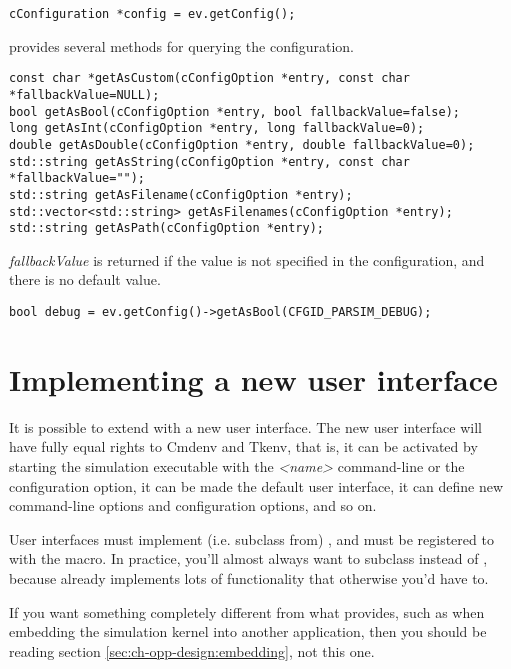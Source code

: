 \begin{verbatim}
cConfiguration *config = ev.getConfig();
\end{verbatim}

 provides several methods for querying the configuration.

\begin{verbatim}
const char *getAsCustom(cConfigOption *entry, const char *fallbackValue=NULL);
bool getAsBool(cConfigOption *entry, bool fallbackValue=false);
long getAsInt(cConfigOption *entry, long fallbackValue=0);
double getAsDouble(cConfigOption *entry, double fallbackValue=0);
std::string getAsString(cConfigOption *entry, const char *fallbackValue="");
std::string getAsFilename(cConfigOption *entry);
std::vector<std::string> getAsFilenames(cConfigOption *entry);
std::string getAsPath(cConfigOption *entry);
\end{verbatim}

\textit{fallbackValue} is returned if the value is not specified in the configuration,
and there is no default value.

\begin{verbatim}
bool debug = ev.getConfig()->getAsBool(CFGID_PARSIM_DEBUG);
\end{verbatim}


\section{Implementing a new user interface}
\label{sec:plugin-exts:userinterface}

It is possible to extend {\opp} with a new user interface. The new
user interface will have fully equal rights to Cmdenv and Tkenv, that is,
it can be activated by starting the simulation executable with the
 \textit{<name>} command-line or the 
configuration option, it can be made the default user interface,
it can define new command-line options and configuration options,
and so on.

User interfaces must implement (i.e. subclass from) ,
and must be registered to {\opp} with the  macro.
In practice, you'll almost always want to subclass 
instead of , because  already
implements lots of functionality that otherwise you'd have to.

\begin{note}
If you want something completely different from what 
provides, such as when embedding the simulation kernel into another
application, then you should be reading section \ref{sec:ch-opp-design:embedding},
not this one.
\end{note}

